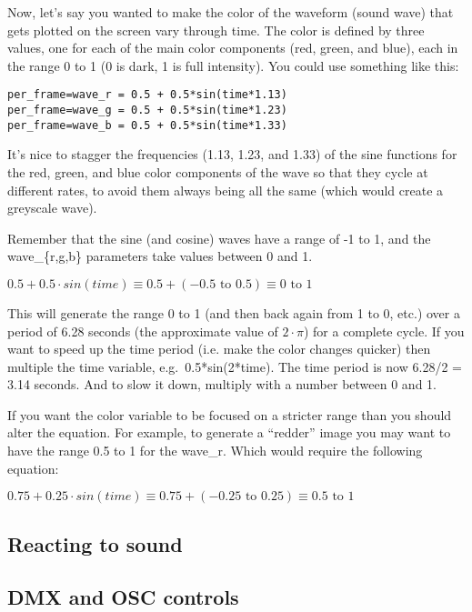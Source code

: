\documentclass[11pt, a5paper, pagesize]{scrbook}
\begin{document}
Now, let's say you wanted to make the color of the waveform (sound wave) that gets plotted on the screen vary through time. The color is defined by three values, one for each of the main color components (red, green, and blue), each in the range 0 to 1 (0 is dark, 1 is full intensity). You could use something like this:

\begin{verbatim}
per_frame=wave_r = 0.5 + 0.5*sin(time*1.13)
per_frame=wave_g = 0.5 + 0.5*sin(time*1.23)
per_frame=wave_b = 0.5 + 0.5*sin(time*1.33)
\end{verbatim}

It's nice to stagger the frequencies (1.13, 1.23, and 1.33) of the sine functions for the red, green, and blue color components of the wave so that they cycle at different rates, to avoid them always being all the same (which would create a greyscale wave).

Remember that the sine (and cosine) waves have a range of -1 to 1, and the wave\_\{r,g,b\} parameters take values between 0 and 1.

\begin{math}
0.5 + 0.5 \cdot sin(time) \equiv 0.5 + (-0.5\textrm{ to }0.5) \equiv 0\textrm{ to }1
\end{math}

This will generate the range 0 to 1 (and then back again from 1 to 0, etc.) over a period of 6.28 seconds (the approximate value of $2 \cdot \pi$) for a complete cycle. If you want to speed up the time period (i.e. make the color changes quicker) then multiple the time variable, e.g.\ 0.5*sin(2*time). The time period is now 6.28/2 = 3.14 seconds. And to slow it down, multiply with a number between 0 and 1. 

If you want the color variable to be focused on a stricter range than you should alter the equation. For example, to generate a ``redder'' image you may want to have the range 0.5 to 1 for the wave\_r. Which would require the following equation:

\begin{math}
0.75 + 0.25 \cdot sin(time) \equiv 0.75 + (-0.25\textrm{ to }0.25) \equiv 0.5\textrm{ to }1
\end{math}

\subsection{Reacting to sound}

\subsection{DMX and OSC controls}
\end{document}
